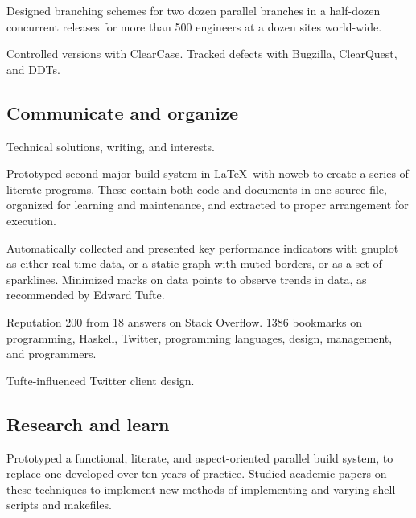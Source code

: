 \documentclass{tufte-handout}
\begin{document}
Designed branching schemes for two dozen parallel branches in a
half-dozen concurrent releases for more than 500 engineers at a dozen
sites world-wide.

Controlled versions with ClearCase.  Tracked defects with Bugzilla,
ClearQuest, and DDTs.


\subsection{Communicate and organize}

Technical
solutions, writing, and interests.

Prototyped second major build system in \LaTeX\ with noweb to create a
series of literate programs.  These contain both code and documents in
one source file, organized for learning and maintenance, and extracted
to proper arrangement for execution.

Automatically collected and presented key performance indicators with
gnuplot as either real-time data, or a static graph with muted borders,
or as a set of sparklines.  Minimized marks on data points to observe
trends in data, as recommended by Edward Tufte.


Reputation
200 from 18 answers on Stack Overflow.
1386 bookmarks on
programming, Haskell, Twitter, programming languages, design,
management, and programmers.

Tufte-influenced
Twitter client design.


\subsection{Research and learn}

Prototyped a functional, literate, and aspect-oriented parallel build
system, to replace one developed over ten years of practice.
Studied academic papers on these techniques to implement new
methods of implementing and varying shell scripts and makefiles.
\end{document}
